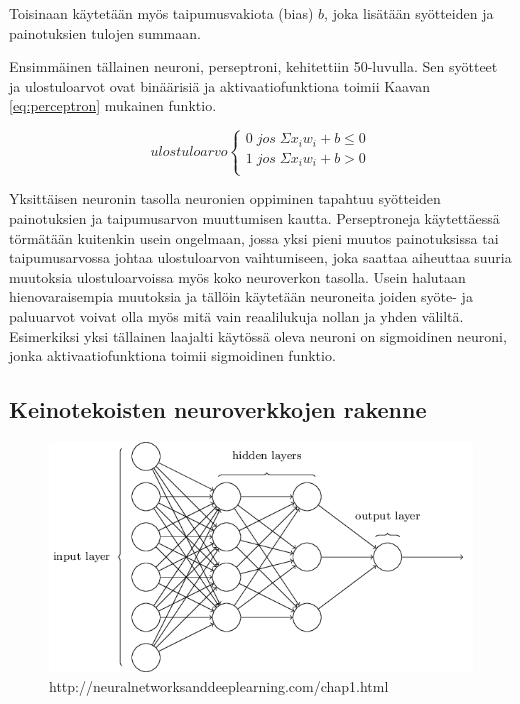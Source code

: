 \documentclass[finnish]{tktltiki2}
\theoremstyle{definition}
\theoremstyle{remark}
\begin{document}
    Toisinaan käytetään myös taipumusvakiota (bias) $b$, joka lisätään syötteiden ja painotuksien tulojen summaan.



    Ensimmäinen tällainen neuroni, perseptroni, kehitettiin 50-luvulla. Sen syötteet ja ulostuloarvot ovat binäärisiä ja aktivaatiofunktiona toimii Kaavan \ref{eq:perceptron} mukainen funktio.

    \begin{equation}
      \label{eq:perceptron}
      ulostuloarvo
      \begin{cases}
        0\; jos \; \Sigma x_i w_i + b \leq 0 \\
        1\; jos \; \Sigma x_i w_i + b > 0 \\
      \end{cases}
    \end{equation}

    Yksittäisen neuronin tasolla neuronien oppiminen tapahtuu syötteiden painotuksien ja taipumusarvon muuttumisen kautta. Perseptroneja käytettäessä törmätään kuitenkin usein ongelmaan, jossa yksi pieni muutos painotuksissa tai taipumusarvossa johtaa ulostuloarvon vaihtumiseen, joka saattaa aiheuttaa suuria muutoksia ulostuloarvoissa myös koko neuroverkon tasolla. Usein halutaan hienovaraisempia muutoksia ja tällöin käytetään neuroneita joiden syöte- ja paluuarvot voivat olla myös mitä vain reaalilukuja nollan ja yhden väliltä. Esimerkiksi yksi tällainen laajalti käytössä oleva neuroni on sigmoidinen neuroni, jonka aktivaatiofunktiona toimii sigmoidinen funktio.



  \subsection{Keinotekoisten neuroverkkojen rakenne}

  \begin{figure}[h]
  \label{pic:neuralnet}
  \centering
  \includegraphics[scale=0.5]{basic-neuralnet}
  \caption{http://neuralnetworksanddeeplearning.com/chap1.html}
  \end{figure}
\end{document}
